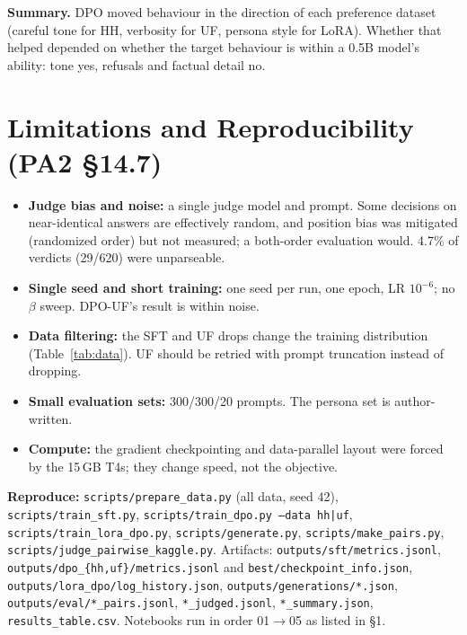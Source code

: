 \documentclass[10pt,a4paper]{article}
\begin{document}
\textbf{Summary.} DPO moved behaviour in the direction of each preference dataset (careful tone for HH, verbosity for UF, persona style for LoRA). Whether that helped depended on whether the target behaviour is within a 0.5B model's ability: tone yes, refusals and factual detail no.

\section{Limitations and Reproducibility (PA2 \S14.7)}
\begin{itemize}
\item \textbf{Judge bias and noise:} a single judge model and prompt. Some decisions on near-identical answers are effectively random, and position bias was mitigated (randomized order) but not measured; a both-order evaluation would. 4.7\% of verdicts (29/620) were unparseable.
\item \textbf{Single seed and short training:} one seed per run, one epoch, LR $10^{-6}$; no $\beta$ sweep. DPO-UF's result is within noise.
\item \textbf{Data filtering:} the SFT and UF drops change the training distribution (Table~\ref{tab:data}). UF should be retried with prompt truncation instead of dropping.
\item \textbf{Small evaluation sets:} 300/300/20 prompts. The persona set is author-written.
\item \textbf{Compute:} the gradient checkpointing and data-parallel layout were forced by the 15\,GB T4s; they change speed, not the objective.
\end{itemize}
\textbf{Reproduce:} \texttt{scripts/prepare\_data.py} (all data, seed 42), \texttt{scripts/train\_sft.py}, \texttt{scripts/train\_dpo.py --data hh|uf}, \texttt{scripts/train\_lora\_dpo.py}, \texttt{scripts/generate.py}, \texttt{scripts/make\_pairs.py}, \texttt{scripts/judge\_pairwise\_kaggle.py}. Artifacts: \texttt{outputs/sft/metrics.jsonl}, \texttt{outputs/dpo\_\{hh,uf\}/metrics.jsonl} and \texttt{best/checkpoint\_info.json}, \texttt{outputs/lora\_dpo/log\_history.json}, \texttt{outputs/generations/*.json}, \texttt{outputs/eval/*\_pairs.jsonl}, \texttt{*\_judged.jsonl}, \texttt{*\_summary.json}, \texttt{results\_table.csv}. Notebooks run in order 01$\to$05 as listed in \S1.

\small
\end{document}
